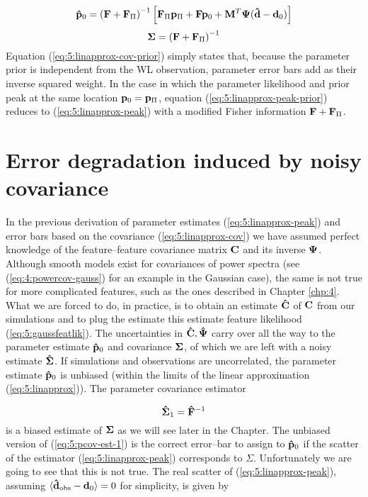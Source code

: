 \begin{equation}
\label{eq:5:linapprox-peak-prior}
\mathbf{\hat{p}}_0 = \left(\mathbf{F}+\mathbf{F}_\Pi\right)^{-1}\left[\mathbf{F}_\Pi\mathbf{p}_\Pi + \mathbf{F}\mathbf{p}_0 + \mathbf{M}^T\mathbf{\Psi}(\mathbf{\hat{d}}-\mathbf{d}_0) \right]
\end{equation}
%
\begin{equation}
\label{eq:5:linapprox-cov-prior}
\mathbf{\Sigma} = \left(\mathbf{F}+\mathbf{F}_\Pi\right)^{-1} 
\end{equation}
%
Equation (\ref{eq:5:linapprox-cov-prior}) simply states that, because the parameter prior is independent from the WL observation, parameter error bars add as their inverse squared weight. In the case in which the parameter likelihood and prior peak at the same location $\mathbf{p}_0=\mathbf{p}_\Pi$, equation (\ref{eq:5:linapprox-peak-prior}) reduces to (\ref{eq:5:linapprox-peak}) with a modified Fisher information $\mathbf{F}+\mathbf{F}_\Pi$.    

\section{Error degradation induced by noisy covariance}
\label{sec:5:degrade}
In the previous derivation of parameter estimates (\ref{eq:5:linapprox-peak}) and error bars based on the covariance (\ref{eq:5:linapprox-cov}) we have assumed perfect knowledge of the feature--feature covariance matrix $\mathbf{C}$ and its inverse $\mathbf{\Psi}$. Although smooth models exist for covariances of power spectra (see (\ref{eq:4:powercov-gauss}) for an example in the Gaussian case), the same is not true for more complicated features, such as the ones described in Chapter \ref{chp:4}. What we are forced to do, in practice, is to obtain an estimate $\mathbf{\hat{C}}$ of $\mathbf{C}$ from our simulations and to plug the estimate this estimate feature likelihood (\ref{eq:5:gaussfeatlik}). The uncertainties in $\mathbf{\hat{C}},\mathbf{\hat{\Psi}}$ carry over all the way to the parameter estimate $\mathbf{\hat{p}}_0$ and covariance $\mathbf{\Sigma}$, of which we are left with a noisy estimate $\mathbf{\hat{\Sigma}}$. If simulations and observations are uncorrelated, the parameter estimate $\mathbf{\hat{p}}_0$ is unbiased (within the limits of the linear approximation (\ref{eq:5:linapprox})). The parameter covariance estimator

\begin{equation}
\label{eq:5:pcov-est-1}
\mathbf{\hat{\Sigma}}_1 = \mathbf{\hat{F}}^{-1}
\end{equation}
%
is a biased estimate of $\mathbf{\Sigma}$ as we will see later in the Chapter. The unbiased version of (\ref{eq:5:pcov-est-1}) is the correct error--bar to assign to $\mathbf{\hat{p}}_0$ if the scatter of the estimator (\ref{eq:5:linapprox-peak}) corresponds to $\Sigma$. Unfortunately we are going to see that this is not true. The real scatter of (\ref{eq:5:linapprox-peak}), assuming $\langle\mathbf{\hat{d}}_{\rm obs}-\mathbf{d}_0\rangle=0$ for simplicity, is given by


